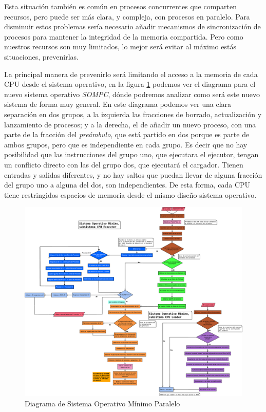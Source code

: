 \documentclass[letterpaper,12pt,oneside]{book}
\begin{document}
            Esta situación también es común en procesos concurrentes que comparten recursos, pero
	 		puede ser más clara, y compleja, con procesos en paralelo. Para disminuir estos problemas sería necesario añadir mecanismos de sincronización de procesos para
	 		mantener la integridad de la memoria compartida. Pero como nuestros recursos son muy limitados, lo mejor será evitar al máximo estás situaciones, prevenirlas.
	 		
	 		La principal manera de prevenirlo será limitando el acceso a la memoria de cada CPU desde el sistema operativo, en la figura \ref{fig:diag_so_parallel}
	 		podemos ver el diagrama para el nuevo sistema operativo \textit{SOMPC}, dónde podremos analizar como será este nuevo sistema de forma muy general. En este diagrama podemos ver una clara separación en dos grupos, a la izquierda
	 		las fracciones de borrado, actualización y lanzamiento de procesos; y a la derecha, el de añadir un nuevo proceso, con una parte de la fracción
	 		del \textit{preámbulo}, que está partido en dos porque es parte de ambos grupos, pero que es independiente en cada grupo. Es decir que no hay posibilidad que las instrucciones
	 		del grupo uno, que ejecutara el ejecutor, tengan un conflicto directo con las del grupo dos, que ejecutará el cargador. 
	 		Tienen entradas y salidas diferentes, y no hay saltos que puedan llevar de alguna fracción del grupo uno a alguna
	 		del dos, son independientes. De esta forma, cada CPU tiene restringidos espacios de memoria desde el mismo diseño sistema operativo.
	 		
	 		

			\begin{figure}[h]		
				\centering
				\includegraphics[width=\textwidth,height=\textheight,keepaspectratio]{media/Paralela/Diagrama_Flujo_SO_Parallel.eps}
				\caption{ Diagrama de Sistema Operativo Mínimo Paralelo }
				\label{fig:diag_so_parallel}
			\end{figure}	 	
	 	
\end{document}
